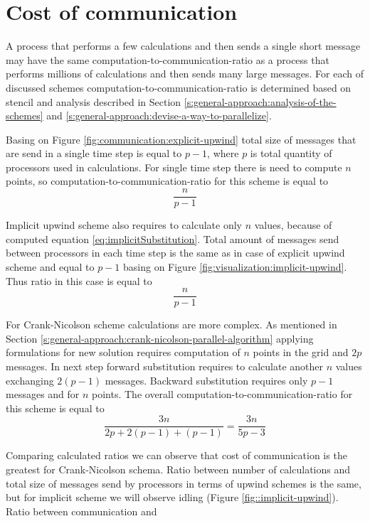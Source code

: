 \section{Cost of communication} \label{s:results:cost-of-communication}
	A process that performs a few calculations and then sends a single short message may have the same \gls{computation-to-communication-ratio} as a process that performs millions of calculations and then sends many large messages. For each of discussed schemes \gls{computation-to-communication-ratio} is determined based on \gls{stencil} and analysis described in Section \ref{s:general-approach:analysis-of-the-schemes} and \ref{s:general-approach:devise-a-way-to-parallelize}.
	
	Basing on Figure \ref{fig:communication:explicit-upwind} total size of messages that are send in a single time step is equal to $p-1$, where $p$ is total quantity of processors used in calculations. For single time step there is need to compute $n$ points, so \gls{computation-to-communication-ratio} for this scheme is equal to
	\begin{equation}
		\frac{n}{p-1}
	\end{equation}
		
	Implicit upwind scheme also requires to calculate only $n$ values, because of computed equation \eqref{eq:implicitSubstitution}. Total amount of messages send between processors in each time step is the same as in case of explicit upwind scheme and equal to $p-1$ basing on Figure \ref{fig:visualization:implicit-upwind}. Thus ratio in this case is equal to
	\begin{equation}
		\frac{n}{p-1}
	\end{equation}
	
	For Crank-Nicolson scheme calculations are more complex. As mentioned in Section \ref{s:general-approach:crank-nicolson-parallel-algorithm} applying formulations for new solution requires computation of $n$ points in the grid and $2p$ messages. In next step forward substitution requires to calculate another $n$ values exchanging $2(p-1)$ messages. Backward substitution requires only $p-1$ messages and for $n$ points. The overall \gls{computation-to-communication-ratio} for this scheme is equal to
	\begin{equation}
		\frac{3n}{2p + 2(p-1) + (p-1)} = \frac{3n}{5p-3}
	\end{equation}
	
	Comparing calculated ratios we can observe that cost of communication is the greatest for Crank-Nicolson schema. Ratio between number of calculations and total size of messages send by processors in terms of upwind schemes is the same, but for implicit scheme we will observe idling (Figure \ref{fig::implicit-upwind}). Ratio between communication and 
	
